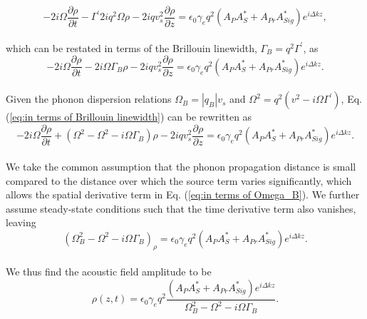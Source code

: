 \documentclass[%
  reprint,
  superscriptaddress,
  amsmath,amssymb,
  aps,
  prapplied,
]{revtex4-2}
\begin{document}
\\
\begin{equation}
    -2i\Omega\frac{\partial\rho}{\partial t} - \Gamma^{\prime}2iq^{2}\Omega\rho - 2iqv_{s}^{2}\frac{\partial\rho}{\partial z} = \epsilon_{0}\gamma_{e}q^{2}(A_{P}A_{S}^{*} + A_{Pr}A_{Sig}^{*})e^{i\Delta kz},
\end{equation}
\\
which can be restated in terms of the Brillouin linewidth, $\Gamma_{B} = q^{2}\Gamma^{\prime}$, as
\\
\begin{equation}
    -2i\Omega\frac{\partial\rho}{\partial t} - 2i\Omega\Gamma_{B}\rho - 2iqv_{s}^{2}\frac{\partial\rho}{\partial z} = \epsilon_{0}\gamma_{e}q^{2}(A_{P}A_{S}^{*} + A_{Pr}A_{Sig}^{*})e^{i\Delta kz}.
    \label{eq:in terms of Brillouin linewidth}
\end{equation}
\\
Given the phonon dispersion relations $\Omega_{B} = |q_{B}|v_{s}$ and $\Omega^{2} = q^{2}\left(v^{2} - i\Omega\Gamma^{\prime}\right)$, Eq. (\ref{eq:in terms of Brillouin linewidth}) can be rewritten as
\\
\begin{equation}
    -2i\Omega\frac{\partial\rho}{\partial t} + \left(\Omega^{2} - \Omega^{2} - i\Omega\Gamma_{B}\right)\rho - 2iqv_{s}^{2}\frac{\partial\rho}{\partial z} = \epsilon_{0}\gamma_{e}q^{2}(A_{P}A_{S}^{*} + A_{Pr}A_{Sig}^{*})e^{i\Delta kz}.
    \label{eq:in terms of Omega_B}
\end{equation}
\\
We take the common assumption that the phonon propagation distance is small compared to the distance over which the source term varies significantly, which allows the spatial derivative term in Eq. (\ref{eq:in terms of Omega_B}). We further assume steady-state conditions such that the time derivative term also vanishes, leaving
\\
\begin{equation}
    (\Omega^{2}_{B} - \Omega^{2} - i\Omega\Gamma_{B})_{\rho} = \epsilon_{0}\gamma_{e}q^{2}(A_{P}A_{S}^{*} + A_{Pr}A_{Sig}^{*})e^{i\Delta kz}.
\end{equation}
\\
We thus find the acoustic field amplitude to be
\\
\begin{equation}
    \rho(z,t) = \epsilon_{0}\gamma_{e}q^{2}\frac{(A_{P}A_{S}^{*} + A_{Pr}A_{Sig}^{*})e^{i\Delta kz}}{\Omega_{B}^{2} - \Omega^{2} - i\Omega\Gamma_{B}}.
    \label{eq:Acoustic field amplitude}
\end{equation}
\end{document}
